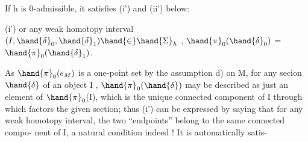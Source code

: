 If h is 0-admissible,  it satisfies  (i') and (ii') below:

(i')  or any weak homotopy interval $(I,\hand{\delta}_0,\hand{\delta}_1)\hand{\in}\hand{\Sigma}_h$ , $\hand{\pi}_0(\hand{\delta}_0)$ = $\hand{\pi}_0(\hand{\delta}_1)$.

As $\hand{\pi}_0(e_M)$  is a one-point set by the assumption d) on M,  for any secion
$\hand{\delta}$ of an object I , $\hand{\pi}_0(\hand{\delta})$ may be described as just an element of $\hand{\pi}_0$(I),
which is the unique connected component of I through which factors the
given section;  thus (i') can be expressed by saying that for any weak
homotopy interval, the two ``endpoints'' belong to the same connected compo-%
nent of I,  a natural condition indeed !  It is automatically satis-%

